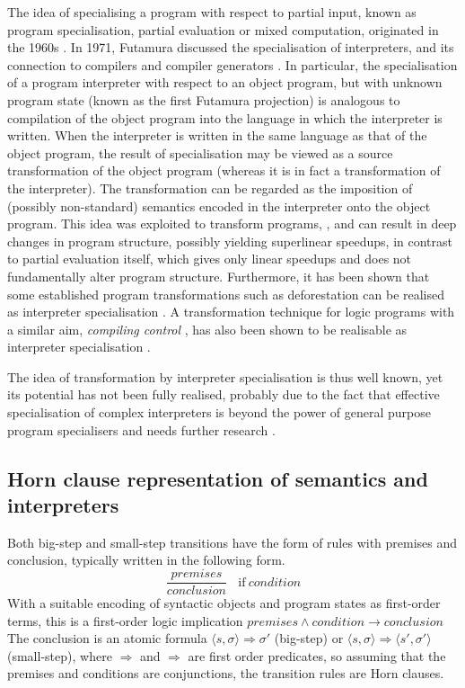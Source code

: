 \documentclass{llncs}
\begin{document}
The idea of specialising a program with respect to partial input,  known as program specialisation, partial evaluation or mixed computation, 
originated in the 1960s \cite{Lombardi,Ershov}.  In 1971, Futamura discussed the specialisation of interpreters, and its connection to compilers and compiler 
generators \cite{Futamura71}.  In particular, the specialisation of a program interpreter with respect to an object program,  but with unknown
program state (known as the first Futamura projection) is analogous to compilation of the object 
program into the language in which the interpreter is written.  
When the interpreter is written in the same language as that of the object program,
the result of specialisation may be viewed as a source transformation of the object program 
(whereas it is in fact a transformation of the interpreter). 
The transformation can be regarded as the imposition of (possibly non-standard) semantics encoded in the
interpreter onto the object program. 
This idea was exploited to transform programs, \cite{Gallagher,Turchin,Glueck,Jones,Giacobazzi}, and can result in deep changes in program structure, 
possibly yielding superlinear speedups, in contrast to partial evaluation itself, which gives only linear speedups and does not fundamentally alter program
structure.  Furthermore, it has been shown that some established program transformations such as deforestation
can be realised as interpreter specialisation \cite{Glueck}.  A transformation technique for logic programs with a similar 
aim, \emph{compiling control} \cite{BruynoogheDeS},
has also been shown to be realisable as interpreter specialisation \cite{Nys}.

The idea of transformation by interpreter specialisation is thus well known, yet its potential has not been fully realised, probably due to the 
fact that effective specialisation of complex interpreters is beyond the power of general purpose program specialisers and needs 
further research \cite{GallagherGlueck}.

\subsection{Horn clause representation of semantics and interpreters}

Both big-step and small-step transitions have the form of rules with premises and conclusion, typically written in the following form.
\[
\dfrac{\mathit{premises}} 
{\mathit{conclusion}} 
~~~~\mathrm{if }~ \mathit{condition}
\]
With a suitable encoding of syntactic objects and program states as first-order terms, this is a first-order logic implication
$\mathit{premises} \wedge \mathit{condition} \rightarrow \mathit{conclusion}$ 
The conclusion is an atomic formula
$\langle s, \sigma\rangle \Longrightarrow \sigma'$ (big-step) or $\langle s, \sigma\rangle \Rightarrow \langle s',\sigma'\rangle$ (small-step),
where $\Longrightarrow$ and $\Rightarrow$ are first order predicates, so assuming that the premises and conditions are conjunctions,
the transition rules are Horn clauses.
\end{document}
